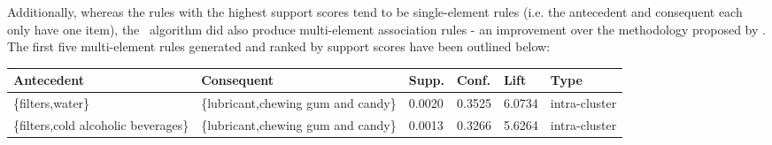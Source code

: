 Additionally, whereas the rules with the highest support scores tend to be single-element rules (i.e. the antecedent and consequent each only have one item), the \algo\ algorithm did also produce multi-element association rules - an improvement over the methodology proposed by . The first five multi-element rules generated and ranked by support scores have been outlined below:
\begin{longtable}
{@{}llllll@{}}\toprule Antecedent& Consequent& Supp.& Conf.& Lift& Type\\*\midrule\endfirsthead\endhead
\{filters,water\} & \{lubricant,chewing gum and candy\} & 0.0020 & 0.3525 & 6.0734 & intra-cluster\\
\{filters,cold alcoholic beverages\} & \{lubricant,chewing gum and candy\} & 0.0013 & 0.3266 & 5.6264 & intra-cluster\\
\midrule\end{longtable}